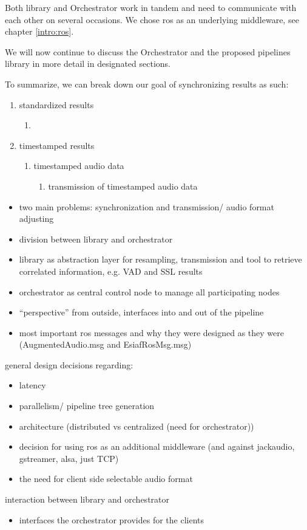 Both library and Orchestrator work in tandem and need to communicate with each other on several occasions.
We chose \gls{ros} as an underlying middleware, see chapter \ref{intro:ros}.

We will now continue to discuss the Orchestrator and the proposed pipelines library in more detail in designated sections.


To summarize, we can break down our goal of synchronizing results as such:
\begin{enumerate}
	\item standardized results 
	\begin{enumerate}
		\item 
	\end{enumerate}
	\item timestamped results
	\begin{enumerate}
		\item timestamped audio data
		\begin{enumerate}
			\item transmission of timestamped audio data
		\end{enumerate}
	\end{enumerate}
\end{enumerate}




\begin{itemize}
	\item two main problems: synchronization and transmission/ audio format adjusting
	\item division between library and orchestrator
	\item library as abstraction layer for resampling, transmission and tool to retrieve correlated information, e.g. VAD and SSL results
	\item orchestrator as central control node to manage all participating nodes
	\item ``perspective'' from outside, interfaces into and out of the pipeline
	\item most important ros messages and why they were designed as they were (AugmentedAudio.msg and EsiafRosMsg.msg)
\end{itemize}

general design decisions regarding:

\begin{itemize}
	\item latency
	\item parallelism/ pipeline tree generation
	\item architecture (distributed vs centralized (need for orchestrator))
	\item decision for using ros as an additional middleware (and against jackaudio, gstreamer, alsa, just TCP)
	\item the need for client side selectable audio format 
\end{itemize}

interaction between library and orchestrator

\begin{itemize}
	\item interfaces the orchestrator provides for the clients
\end{itemize}



\newpage

\newpage
